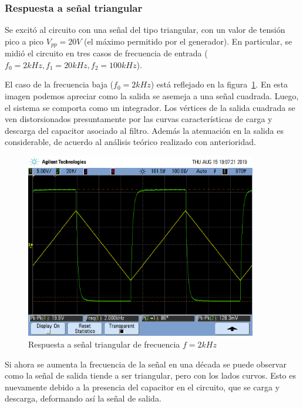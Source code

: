  \subsubsection*{Respuesta a señal triangular}

 Se excitó al circuito con una señal del tipo triangular, con un valor de tensión pico a pico $V_{pp}=20V$ (el máximo permitido por el generador). 
 En particular, se midió el circuito en tres casos de frecuencia de entrada ($f_0=2kHz, f_1=20kHz, f_2=100kHz$).


El caso de la frecuencia baja ($f_0=2kHz$) está reflejado en la figura~\ref{fig:pasaaltos_triangular_baja}. En esta imagen podemos apreciar como la salida se asemeja a una señal cuadrada.
 Luego, el sistema se comporta como un integrador. Los vértices de la salida cuadrada se ven distorsionados presuntamente por las curvas características de carga y descarga del capacitor asociado al filtro.
 Además la atenuación en la salida es considerable, de acuerdo al análisis teórico realizado con anterioridad.

 \begin{figure}[H]
    \centering
    \includegraphics[width = 0.9\textwidth]{../Desarrollo/pasaaltos_triangular_2k.png}
    \caption{Respuesta a señal triangular de frecuencia $f=2kHz$}
    \label{fig:pasaaltos_triangular_baja}
 \end{figure}
 
Si ahora se aumenta la frecuencia de la señal en una década se puede observar como la señal de salida tiende a ser triangular, pero con los lados curvos. Esto es nuevamente debido a la presencia del capacitor en el circuito, que se carga y descarga, deformando así la señal de salida.

